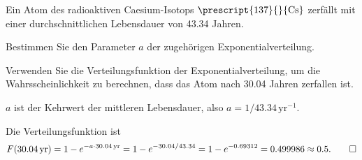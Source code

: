 Ein Atom des radioaktiven Caesium-Isotops $\prescript{137}{}{\text{Cs}}$ 
zerfällt mit einer durchschnittlichen Lebensdauer von 43.34 Jahren.
\begin{teilaufgaben}
\item
Bestimmen Sie den Parameter $a$ der zugehörigen Exponentialverteilung.
\item
Verwenden Sie die Verteilungsfunktion der Exponentialverteilung, um die
Wahrsscheinlichkeit zu berechnen, dass das Atom nach 30.04 Jahren
zerfallen ist.
\end{teilaufgaben}

\begin{loesung}
\begin{teilaufgaben}
\item
$a$ ist der Kehrwert der mittleren Lebensdauer, also
$a=1/43.34\,\text{yr}^{-1}$.
\item
Die Verteilungsfunktion ist
\[
F(30.04\,\text{yr})
=
1-e^{-a\cdot 30.04\,\text{yr}}
=
1-e^{-30.04/43.34}
=
1-e^{-0.69312}
=
0.499986
\approx
0.5.
\qedhere
\]
\end{teilaufgaben}
\end{loesung}
